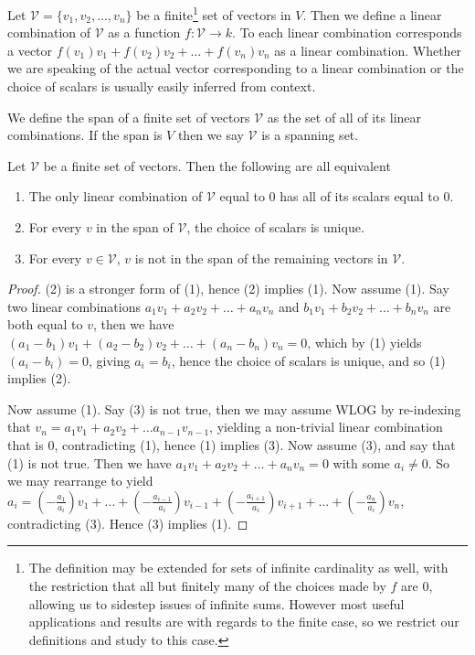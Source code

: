 \documentclass[]{article}
\begin{document}
\begin{defi} 
		Let $\mathcal{V} = \{v_1, v_2, \ldots, v_n\}$ be a finite\footnote{\label{infinite-linear-combinations} The definition may be extended for sets of infinite cardinality as well, with the restriction that all but finitely many of the choices made by $f$ are $0$, allowing us to sidestep issues of infinite sums. However most useful applications and results are with regards to the finite case, so we restrict our definitions and study to this case.} set of vectors in $V$. Then we define a linear combination of $\mathcal{V}$ as a function $f: \mathcal{V} \to k$. To each linear combination corresponds a vector $f(v_1) v_1 + f(v_2) v_2 + \ldots + f(v_n) v_n$ as a linear combination. Whether we are speaking of the actual vector corresponding to a linear combination or the choice of scalars is usually easily inferred from context.
\end{defi}

\begin{defi} [Span]
		We define the span of a finite set of vectors $\mathcal{V}$ as the set of all of its linear combinations. If the span is $V$ then we say $\mathcal{V}$ is a spanning set.
\end{defi}

\begin{thm} \label{thm:equiv-lin-ind}
		Let $\mathcal{V}$ be a finite set of vectors. Then the following are all equivalent
		\begin{enumerate}
				\item The only linear combination of $\mathcal{V}$ equal to $0$ has all of its scalars equal to $0$.
				\item For every $v$ in the span of $\mathcal{V}$, the choice of scalars is unique.
				\item For every $v \in \mathcal{V}$, $v$ is not in the span of the remaining vectors in $\mathcal{V}$.
		\end{enumerate}
\end{thm}

\begin{proof}
		(2) is a stronger form of (1), hence (2) implies (1). Now assume (1). Say two linear combinations $a_1 v_1 + a_2 v_2 + \ldots + a_n v_n$ and $b_1 v_1 + b_2 v_2 + \ldots + b_n v_n$ are both equal to $v$, then we have $(a_1 - b_1) v_1 + (a_2 - b_2) v_2 + \ldots + (a_n - b_n) v_n = 0$, which by (1) yields $(a_i - b_i) = 0$, giving $a_i = b_i$, hence the choice of scalars is unique, and so (1) implies (2).

		Now assume (1). Say (3) is not true, then we may assume WLOG by re-indexing that $v_n = a_1 v_1 + a_2 v_2 + \ldots a_{n-1} v_{n-1}$, yielding a non-trivial linear combination that is $0$, contradicting (1), hence (1) implies (3). Now assume (3), and say that (1) is not true. Then we have $a_1 v_1 + a_2 v_2 + \ldots + a_n v_n = 0$ with some $a_i \neq 0$. So we may rearrange to yield $a_i = (-\frac{a_1}{a_i}) v_1 + \ldots + (-\frac{a_{i-1}}{a_i}) v_{i-1} + (-\frac{a_{i+1}}{a_i}) v_{i+1} + \ldots + (-\frac{a_n}{a_i}) v_n$, contradicting (3). Hence (3) implies (1).
\end{proof}
\end{document}
